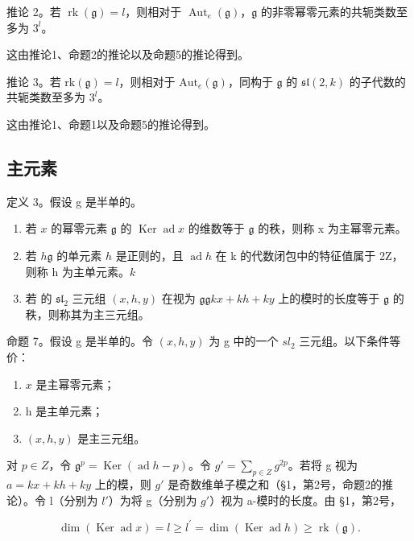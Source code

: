 推论 2。若 \(\operatorname{rk}(\mathfrak{g}) = l\)，则相对于 \(\operatorname{Aut}_e(\mathfrak{g})\)，\(\mathfrak{g}\) 的非零幂零元素的共轭类数至多为 \(3^l\)。

这由推论1、命题2的推论以及命题5的推论得到。

推论 3。若 \(\mathrm{rk}(\mathfrak{g}) = l\)，则相对于 \(\mathrm{Aut}_e(\mathfrak{g})\)，同构于 \(\mathfrak{g}\) 的 \(\mathfrak{sl}(2,k)\) 的子代数的共轭类数至多为 \(3^l\)。

这由推论1、命题1以及命题5的推论得到。

\subsection{主元素}

定义 3。假设 g 是半单的。

\begin{enumerate}
\def\labelenumi{(\roman{enumi})}
\item
  若 \(x\) 的幂零元素 \(\mathfrak{g}\) 的 \(\operatorname{Ker} \operatorname{ad} x\) 的维数等于 \(\mathfrak{g}\) 的秩，则称 x 为主幂零元素。
\item
  若 \(h\)\(\mathfrak{g}\) 的单元素 \(h\) 是正则的，且 \(\operatorname{ad} h\) 在 k 的代数闭包中的特征值属于 2Z，则称 h 为主单元素。\(k\)
\item
  若  的 \(\mathfrak{sl}_2\) 三元组 \((x,h,y)\) 在视为 \(\mathfrak{g}\)\(\mathfrak{g}\)\(kx + kh + ky\) 上的模时的长度等于 \(\mathfrak{g}\) 的秩，则称其为主三元组。
\end{enumerate}

命题 7。假设 g 是半单的。令 \((x,h,y)\) 为 g 中的一个 \(sl_{2}\) 三元组。以下条件等价：

\begin{enumerate}
\def\labelenumi{(\roman{enumi})}
\item
  \(x\) 是主幂零元素；
\item
  h 是主单元素；
\item
  \((x,h,y)\) 是主三元组。
\end{enumerate}

对 \(p \in Z\)，令 \(\mathfrak{g}^{p} = \operatorname{Ker}(\operatorname{ad} h - p)\)。令 \(g' = \sum_{p \in Z} g^{2p}\)。若将 g 视为 \(a = kx + kh + ky\) 上的模，则 \(g'\) 是奇数维单子模之和（§1，第2号，命题2的推论）。令 l（分别为 \(l'\)）为将 g（分别为 \(g'\)）视为 a-模时的长度。由 §1，第2号，

\[
\dim (\operatorname{Ker} \operatorname{ad} x) = l \geq l ^ {\prime} = \dim (\operatorname{Ker} \operatorname{ad} h) \geq \operatorname{rk} (\mathfrak {g}).
\]

